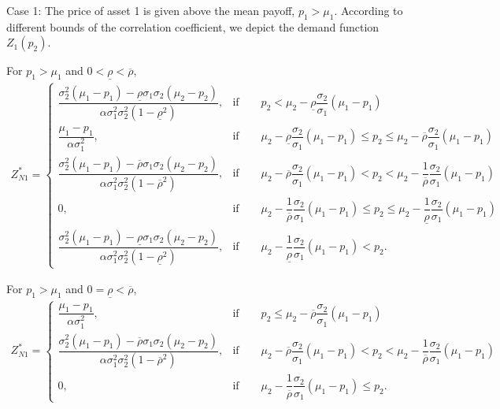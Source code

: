 \documentclass[10pt]{article}
\begin{document}
Case 1: The price of asset 1 is given above the mean payoff, $ p_1 > \mu_1 $. According to different bounds of the correlation coefficient, we depict the demand function $ Z_1 (p_2) $.

For $ p_1 > \mu_1 $ and $ 0 < \underline{\rho} < \overline{\rho} $,
{\footnotesize \begin{eqnarray}
Z_{N 1}^* = \left\{ \begin{matrix}
\dfrac{\sigma_2^2 (\mu_1 - p_1) - \underline{\rho} \sigma_1 \sigma_2 (\mu_2 - p_2)}{\alpha \sigma_1^2 \sigma_2^2 (1 - \underline{\rho}^2)}, & \text{if} \qquad p_2 < \mu_2 - \underline{\rho} \dfrac{\sigma_2}{\sigma_1} (\mu_1 - p_1) \\
\dfrac{\mu_1 - p_1}{\alpha \sigma_1^2}, & \text{if} \qquad \mu_2 - \underline{\rho} \dfrac{\sigma_2}{\sigma_1} (\mu_1 - p_1) \leqslant p_2 \leqslant \mu_2 - \overline{\rho} \dfrac{\sigma_2}{\sigma_1} (\mu_1 - p_1) \\
\dfrac{\sigma_2^2 (\mu_1 - p_1) - \overline{\rho} \sigma_1 \sigma_2 (\mu_2 - p_2)}{\alpha \sigma_1^2 \sigma_2^2 (1 - \overline{\rho}^2)}, & \text{if} \qquad \mu_2 - \overline{\rho} \dfrac{\sigma_2}{\sigma_1} (\mu_1 - p_1) < p_2 < \mu_2 - \dfrac1{\overline{\rho}} \dfrac{\sigma_2}{\sigma_1} (\mu_1 - p_1) \\
0, & \text{if} \qquad \mu_2 - \dfrac1{\overline{\rho}} \dfrac{\sigma_2}{\sigma_1} (\mu_1 - p_1) \leqslant p_2 \leqslant \mu_2 - \dfrac1{\underline{\rho}} \dfrac{\sigma_2}{\sigma_1} (\mu_1 - p_1) \\
\dfrac{\sigma_2^2 (\mu_1 - p_1) - \underline{\rho} \sigma_1 \sigma_2 (\mu_2 - p_2)}{\alpha \sigma_1^2 \sigma_2^2 (1 - \underline{\rho}^2)}, & \text{if} \qquad \mu_2 - \dfrac1{\underline{\rho}} \dfrac{\sigma_2}{\sigma_1} (\mu_1 - p_1) < p_2.
\end{matrix} \right.
\end{eqnarray}}

For $ p_1 > \mu_1 $ and $ 0 = \underline{\rho} < \overline{\rho} $,
{\footnotesize \begin{eqnarray}
Z_{N 1}^* = \left\{ \begin{matrix}
\dfrac{\mu_1 - p_1}{\alpha \sigma_1^2}, & \text{if} \qquad p_2 \leqslant \mu_2 - \overline{\rho} \dfrac{\sigma_2}{\sigma_1} (\mu_1 - p_1) \\
\dfrac{\sigma_2^2 (\mu_1 - p_1) - \overline{\rho} \sigma_1 \sigma_2 (\mu_2 - p_2)}{\alpha \sigma_1^2 \sigma_2^2 (1 - \overline{\rho}^2)}, & \text{if} \qquad \mu_2 - \overline{\rho} \dfrac{\sigma_2}{\sigma_1} (\mu_1 - p_1) < p_2 < \mu_2 - \dfrac1{\overline{\rho}} \dfrac{\sigma_2}{\sigma_1} (\mu_1 - p_1) \\
0, & \text{if} \qquad \mu_2 - \dfrac1{\overline{\rho}} \dfrac{\sigma_2}{\sigma_1} (\mu_1 - p_1) \leqslant p_2.
\end{matrix} \right.
\end{eqnarray}}
\end{document}
